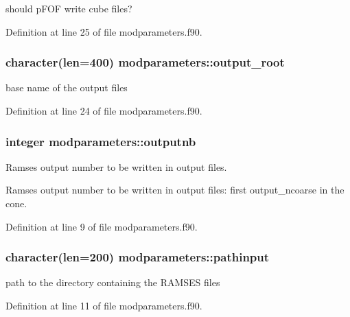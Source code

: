 should p\-F\-O\-F write cube files? 



Definition at line 25 of file modparameters.\-f90.

\hypertarget{classmodparameters_aa1b8579820672ba40e918b0bed1abfc2}{
\subsubsection[{output\-\_\-root}]{\setlength{\rightskip}{0pt plus 5cm}character(len=400) modparameters\-::output\-\_\-root}}\label{classmodparameters_aa1b8579820672ba40e918b0bed1abfc2}


base name of the output files 



Definition at line 24 of file modparameters.\-f90.

\hypertarget{classmodparameters_a87dfe1d42999b2cfebdae2ca4e3671f6}{
\subsubsection[{outputnb}]{\setlength{\rightskip}{0pt plus 5cm}integer modparameters\-::outputnb}}\label{classmodparameters_a87dfe1d42999b2cfebdae2ca4e3671f6}


Ramses output number to be written in output files. 

Ramses output number to be written in output files\-: first output\-\_\-ncoarse in the cone. 

Definition at line 9 of file modparameters.\-f90.

\hypertarget{classmodparameters_afd21f9138d2720f8990c6e62a65457be}{
\subsubsection[{pathinput}]{\setlength{\rightskip}{0pt plus 5cm}character(len=200) modparameters\-::pathinput}}\label{classmodparameters_afd21f9138d2720f8990c6e62a65457be}


path to the directory containing the R\-A\-M\-S\-E\-S files 



Definition at line 11 of file modparameters.\-f90.

